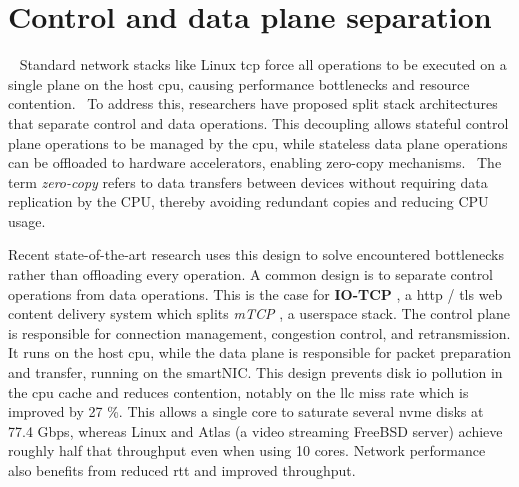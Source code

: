 \section{Control and data plane separation}


~
Standard network stacks like Linux \acrshort{tcp} force all operations to be executed on a single plane on the host \acrshort{cpu}, causing performance bottlenecks and resource contention.~ To address this, researchers have proposed split stack architectures that separate control and data operations. This decoupling allows stateful control plane operations to be managed by the \acrshort{cpu}, while stateless data plane operations can be offloaded to hardware accelerators, enabling zero-copy mechanisms.~ The term \textit{zero-copy} refers to data transfers between devices without requiring data replication by the CPU, thereby avoiding redundant copies and reducing CPU usage.

Recent state-of-the-art research uses this design to solve encountered bottlenecks rather than offloading every operation. A common design is to separate control operations from data operations. This is the case for \textbf{IO-TCP} \cite{kim_rearchitecting_2023}, a \acrshort{http} / \acrshort{tls} web content delivery system which splits \textit{mTCP} \cite{jeong_mtcp_2014}, a userspace stack. The control plane is responsible for connection management, congestion control, and retransmission. It runs on the host \acrshort{cpu}, while the data plane is responsible for packet preparation and transfer, running on the smartNIC. This design prevents disk \acrshort{io} pollution in the \acrshort{cpu} cache and reduces contention, notably on the \acrfull{llc} miss rate which is improved by 27 \%. This allows a single core to saturate several \acrshort{nvme} disks at 77.4 Gbps, whereas Linux and Atlas \cite{marinos_diskcryptnet_2017} (a video streaming FreeBSD server) achieve roughly half that throughput even when using 10 cores. Network performance also benefits from reduced \acrshort{rtt} and improved throughput.


